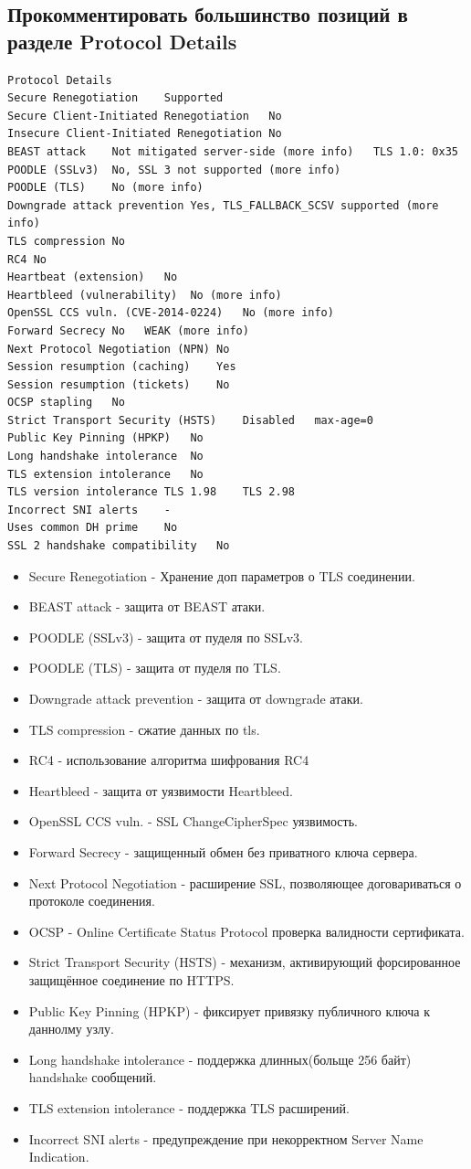 \documentclass[12pt,a4paper]{article}
\begin{document}
\subsection{Прокомментировать большинство позиций в разделе Protocol Details}
\begin{verbatim}
Protocol Details
Secure Renegotiation	Supported
Secure Client-Initiated Renegotiation	No
Insecure Client-Initiated Renegotiation	No
BEAST attack	Not mitigated server-side (more info)   TLS 1.0: 0x35
POODLE (SSLv3)	No, SSL 3 not supported (more info)
POODLE (TLS)	No (more info)
Downgrade attack prevention	Yes, TLS_FALLBACK_SCSV supported (more info)
TLS compression	No
RC4	No
Heartbeat (extension)	No
Heartbleed (vulnerability)	No (more info)
OpenSSL CCS vuln. (CVE-2014-0224)	No (more info)
Forward Secrecy	No   WEAK (more info)
Next Protocol Negotiation (NPN)	No
Session resumption (caching)	Yes
Session resumption (tickets)	No
OCSP stapling	No
Strict Transport Security (HSTS)	Disabled   max-age=0
Public Key Pinning (HPKP)	No
Long handshake intolerance	No
TLS extension intolerance	No
TLS version intolerance	TLS 1.98 	TLS 2.98 
Incorrect SNI alerts	-
Uses common DH prime	No
SSL 2 handshake compatibility	No
\end{verbatim}
\begin{itemize}
\item Secure Renegotiation - Хранение доп параметров о TLS соединении.
\item BEAST attack - защита от BEAST атаки.
\item POODLE (SSLv3) - защита от пуделя по SSLv3.
\item POODLE (TLS) - защита от пуделя по TLS.
\item Downgrade attack prevention - защита от downgrade атаки.
\item TLS compression - сжатие данных по tls.
\item RC4 - использование алгоритма шифрования RC4
\item Heartbleed - защита от уязвимости Heartbleed.
\item OpenSSL CCS vuln. - SSL ChangeCipherSpec уязвимость.
\item Forward Secrecy - защищенный обмен без приватного ключа сервера.
\item Next Protocol Negotiation - расширение SSL, позволяющее договариваться о протоколе соединения.
\item OCSP - Online Certificate Status Protocol проверка валидности сертификата.
\item Strict Transport Security (HSTS) - механизм, активирующий форсированное защищённое соединение по HTTPS.
\item Public Key Pinning (HPKP) - фиксирует привязку публичного ключа к даннолму узлу.
\item Long handshake intolerance - поддержка длинных(больще 256 байт) handshake сообщений.
\item TLS extension intolerance - поддержка TLS расширений.
\item Incorrect SNI alerts - предупреждение при некорректном Server Name Indication.
\end{itemize}
\end{document}
